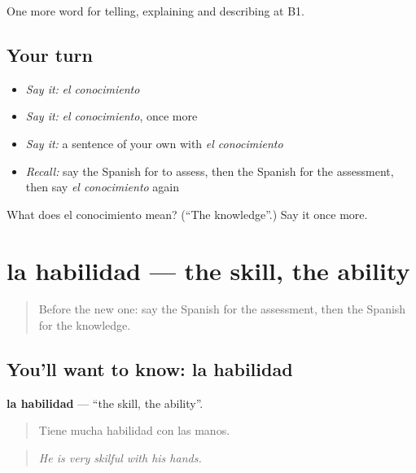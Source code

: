 \begin{grammarlens}[title={What you've built}]
One more word for telling, explaining and describing at B1.
\end{grammarlens}

\subsection*{Your turn}
\begin{itemize}
\raggedright
  \item \emph{Say it:} \emph{el conocimiento}
  \item \emph{Say it:} \emph{el conocimiento}, once more
  \item \emph{Say it:} a sentence of your own with \emph{el conocimiento}
  \item \emph{Recall:} say the Spanish for to assess, then the Spanish for the assessment, then say \emph{el conocimiento} again
\end{itemize}

\begin{tcolorbox}[breakable,colback=teal!4,colframe=teal!35!black,title={Before you move on}]
What does el conocimiento mean? (\textquotedblleft{}The knowledge\textquotedblright{}.) Say it once more.
\end{tcolorbox}
\section[la habilidad]{la habilidad — the skill, the ability}

\label{lesson:ES-C598-habilidad}



\begin{quote}
Before the new one: say the Spanish for the assessment, then the Spanish for the knowledge.
\end{quote}

\subsection*{You'll want to know: la habilidad}
\textbf{la habilidad} — \textquotedblleft{}the skill, the ability\textquotedblright{}.

\begin{quote}
Tiene mucha habilidad con las manos.
\end{quote}

\begin{quote}
\emph{He is very skilful with his hands.}
\end{quote}

